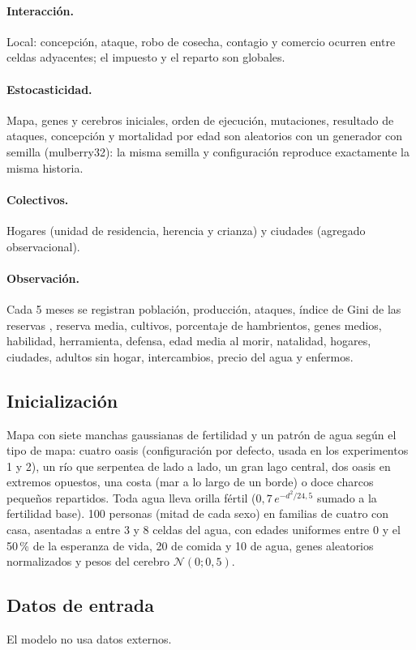 \documentclass[11pt,a4paper]{article}
\begin{document}
\paragraph{Interacción.} Local: concepción, ataque, robo de cosecha, contagio y comercio ocurren entre celdas adyacentes; el impuesto y el reparto son globales.
\paragraph{Estocasticidad.} Mapa, genes y cerebros iniciales, orden de ejecución, mutaciones, resultado de ataques, concepción y mortalidad por edad son aleatorios con un generador con semilla (mulberry32): la misma semilla y configuración reproduce exactamente la misma historia.
\paragraph{Colectivos.} Hogares (unidad de residencia, herencia y crianza) y ciudades (agregado observacional).
\paragraph{Observación.} Cada 5 meses se registran población, producción, ataques, índice de Gini de las reservas \citep{gini1921}, reserva media, cultivos, porcentaje de hambrientos, genes medios, habilidad, herramienta, defensa, edad media al morir, natalidad, hogares, ciudades, adultos sin hogar, intercambios, precio del agua y enfermos.

\subsection{Inicialización}
Mapa con siete manchas gaussianas de fertilidad y un patrón de agua según el tipo de mapa: cuatro oasis (configuración por defecto, usada en los experimentos 1 y 2), un río que serpentea de lado a lado, un gran lago central, dos oasis en extremos opuestos, una costa (mar a lo largo de un borde) o doce charcos pequeños repartidos. Toda agua lleva orilla fértil ($0{,}7\,e^{-d^2/24{,}5}$ sumado a la fertilidad base). 100 personas (mitad de cada sexo) en familias de cuatro con casa, asentadas a entre 3 y 8 celdas del agua, con edades uniformes entre 0 y el 50\,\% de la esperanza de vida, 20 de comida y 10 de agua, genes aleatorios normalizados y pesos del cerebro $\mathcal{N}(0;0{,}5)$.

\subsection{Datos de entrada}
El modelo no usa datos externos.
\end{document}
